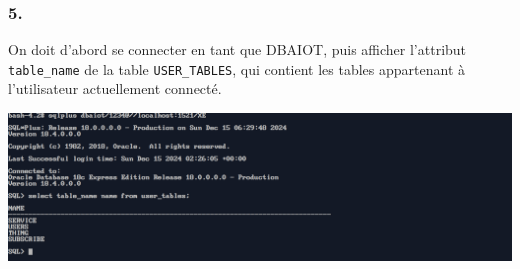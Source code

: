 \subsubsection*{5.}
On doit d'abord se connecter en tant que DBAIOT, puis afficher l'attribut \texttt{table\_name}
de la table \texttt{USER\_TABLES}, qui contient les tables appartenant à l'utilisateur actuellement connecté.



\begin{center}
    \includegraphics[width=\textwidth]{ScreenShot/Partie5/q5.png}
\end{center}



